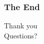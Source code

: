 \documentclass[hyperref={pdfpagelabels=false}]{beamer}
\begin{document}
{
\begin{frame}[plain]\frametitle{The End}
\centering
\Huge
Thank you\\
Questions?
\end{frame}
}
%
\end{document}
